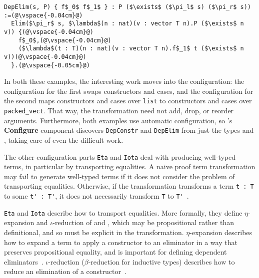 \begin{lstlisting}
DepElim(s, P) { f$_0$ f$_1$ } : P ($\exists$ ($\pi_l$ s) ($\pi_r$ s)) :=(@\vspace{-0.04cm}@)
  Elim($\pi_r$ s, $\lambda$(n : nat)(v : vector T n).P ($\exists$ n v)) {(@\vspace{-0.04cm}@)
    f$_0$,(@\vspace{-0.04cm}@)
    ($\lambda$(t : T)(n : nat)(v : vector T n).f$_1$ t ($\exists$ n v))(@\vspace{-0.04cm}@)
  }.(@\vspace{-0.05cm}@) 
\end{lstlisting}

In both these examples, the interesting work moves into the configuration:
the configuration for the first swaps constructors and cases,
and the configuration for the second maps constructors and cases over \lstinline{list} to constructors and cases over \lstinline{packed_vect}. %
That way, the transformation need not add, drop, or reorder arguments.
Furthermore, both examples use automatic configuration, so \toolname's \textbf{Configure} component 
discovers \lstinline{DepConstr} and \lstinline{DepElim} from just the types \A and \B, taking care of even the difficult work.

The other configuration parts \lstinline{Eta} and \lstinline{Iota} deal with producing well-typed terms,
in particular by transporting equalities.
A naive proof term transformation
may fail to generate well-typed terms if it does not consider the problem of transporting equalities.
Otherwise, if the transformation transforms a term \lstinline{t : T} to some \lstinline{t' : T'}, it does not necessarily
transform \lstinline{T} to \lstinline{T'}~\cite{tabareau2019marriage}.

\lstinline{Eta} and \lstinline{Iota} describe how to transport equalities.
More formally, they define $\eta$-expansion and $\iota$-reduction of \A and \B,
which may be propositional rather than definitional, and so must be explicit in the transformation.
$\eta$-expansion describes how to expand a term to apply a constructor to an eliminator in a way that preserves propositional equality,
and is important for defining dependent eliminators~\cite{nlab:eta-conversion}.
$\iota$-reduction ($\beta$-reduction for inductive types) describes how to reduce an elimination of a constructor~\cite{nlab:beta-reduction}.

